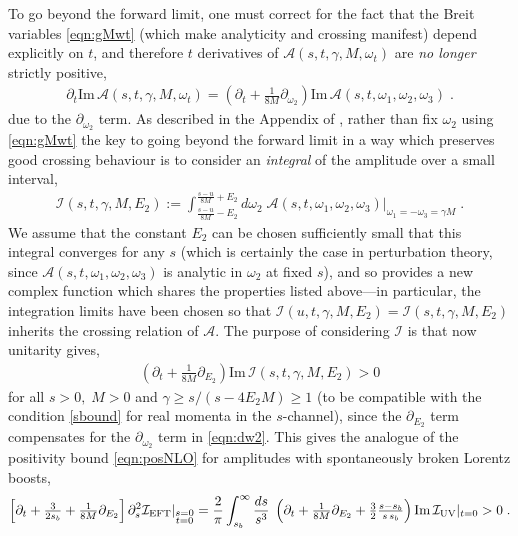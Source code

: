 \documentclass[11pt]{article}
\begin{document}
To go beyond the forward limit, one must correct for the fact that the Breit variables \eqref{eqn:gMwt} (which make analyticity and crossing manifest) depend explicitly on $t$, and therefore $t$ derivatives of $\mathcal{A} (s,t,\gamma, M ,\omega_t)$ are \emph{no longer} strictly positive, 
\begin{align}
 \partial_t \text{Im} \, \mathcal{A} (s, t, \gamma , M, \omega_t  ) = \left( \partial_t + \tfrac{1}{8M} \partial_{\omega_2} \right) \text{Im} \, \mathcal{A} \left( s, t, \omega_1, \omega_2, \omega_3 \right) \; . 
\label{eqn:dw2}
\end{align}
due to the $\partial_{\omega_2}$ term.
As described in the Appendix of \cite{Grall:2021xxm}, rather than fix $\omega_2$ using \eqref{eqn:gMwt} the key to going beyond the forward limit in a way which preserves good crossing behaviour is to consider an \emph{integral} of the amplitude over a small interval,
\begin{align}
\mathcal{I} ( s, t, \gamma , M ,  E_2 ) := \int_{ \frac{s-u}{8M} - E_2 }^{\frac{s-u}{8M} + E_2 } d \omega_2 \; \mathcal{A} ( s, t , \omega_1 , \omega_2 ,  \omega_3 ) |_{\omega_1 = -\omega_3 = \gamma M}  \; .
\end{align}
We assume that the constant $E_2$ can be chosen sufficiently small that this integral converges for any $s$ (which is certainly the case in perturbation theory, since  $\mathcal{A} (s, t, \omega_1 , \omega_2, \omega_3 )$ is analytic in $\omega_2$ at fixed $s$), and so provides a new complex function which shares the properties listed above---in particular, the integration limits have been chosen so that $\mathcal{I} ( u, t, \gamma, M , E_2) = \mathcal{I} ( s, t, \gamma, M , E_2)$ inherits the crossing relation of $\mathcal{A}$. 
The purpose of considering $\mathcal{I}$ is that now unitarity gives,
\begin{align}
\left( \partial_t + \tfrac{1}{8M} \partial_{E_2}   \right) \text{Im}\,  \mathcal{I} (s, t, \gamma , M , E_2 ) >  0  
\end{align}
for all $s > 0 , \;  M >0  $ and $\gamma \geq s / (s - 4 E_2 M) \geq 1$ (to be compatible with the condition \eqref{sbound} for real momenta in the $s$-channel), since the $\partial_{E_2}$ term compensates for the $\partial_{\omega_2}$ term in \eqref{eqn:dw2}.
This gives the analogue of the positivity bound \eqref{eqn:posNLO} for amplitudes with spontaneously broken Lorentz boosts,
\begin{align}
\left[ \partial_t + \tfrac{3}{2 s_b} + \tfrac{1}{8M} \partial_{E_2}   \right] \partial_s^2 \mathcal{I}_{\rm EFT} |_{\substack{s=0 \\ t=0 }}  
= \frac{2}{\pi} \int_{s_b}^{\infty} \frac{d s}{ s^3}  \;\left( \partial_t + \tfrac{1}{8M} \partial_{E_2}  + \tfrac{3}{2} \tfrac{ s - s_b}{ s \, s_b}  \right)  \text{Im} \, \mathcal{I}_{\rm UV}  |_{t=0}  
> 0 \;  .
\label{eqn:posNLO2}
\end{align}
\end{document}
